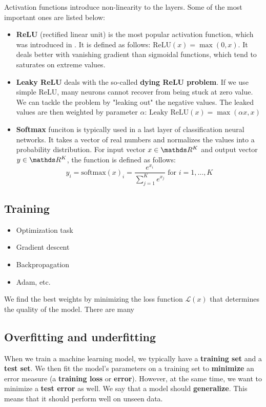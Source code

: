 Activation functions introduce non-linearity to the layers. Some of the most important ones are listed below:
\begin{itemize}
\item \textbf{ReLU} (rectified linear unit) is the most popular activation function, which was introduced in \cite{pmlr-v15-glorot11a}. It is defined as follows: $\text{ReLU}(x) = \max(0, x)$. It deals better with vanishing gradient than sigmoidal functions, which tend to saturates on extreme values.
\item \textbf{Leaky ReLU} deals with the so-called \textbf{dying ReLU problem}. If we use simple ReLU, many neurons cannot recover from being stuck at zero value. We can tackle the problem by "leaking out" the negative values. The leaked values are then weighted by parameter $\alpha$: $\text{Leaky ReLU}(x) = \max(\alpha x, x)$
\item \textbf{Softmax} funciton is typically used in a last layer of classification neural networks. It takes a vector of real numbers and normalizes the values into a probability distribution. For input vector $x \in \real^K$ and output vector $y \in \real^K$, the function is defined as follows:
$$
    y_i = \text{softmax}(x)_i = \frac{e^{x_i}}{\sum\limits^{K}_{j = 1} e^{x_j}} \text{ for } i = 1,...,K
$$
\end{itemize}

\subsection{Training}
\label{sec:training}
\begin{itemize}
    \item Optimization task
    \item Gradient descent
    \item Backpropagation
    \item Adam, etc.
\end{itemize}
We find the best weights by minimizing the loss function $\mathcal{L}(x)$ that determines the quality of the model.
There are many 



\subsection{Overfitting and underfitting}

When we train a machine learning model, we typically have a \textbf{training set} and a \textbf{test set}. We then fit the model's parameters on a training set to \textbf{minimize} an error measure (a \textbf{training loss} or \textbf{error}). However, at the same time, we want to minimize a \textbf{test error} as well. We say that a model should \textbf{generalize}. This means that it should perform well on unseen data.

